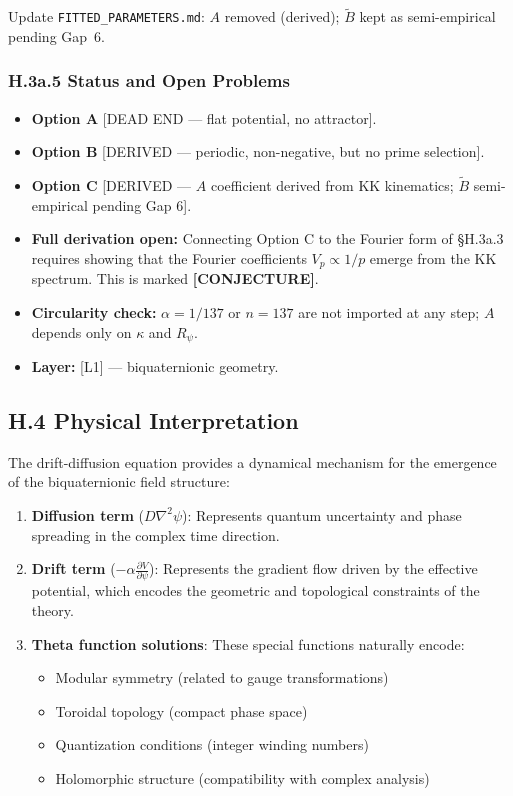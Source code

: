 Update \texttt{FITTED\_PARAMETERS.md}: $A$ removed (derived); $\tilde{B}$ kept as semi-empirical pending Gap~6.

\subsubsection*{H.3a.5 Status and Open Problems}

\begin{itemize}
\item \textbf{Option A} [DEAD END — flat potential, no attractor].
\item \textbf{Option B} [DERIVED — periodic, non-negative, but no prime selection].
\item \textbf{Option C} [DERIVED — $A$ coefficient derived from KK kinematics;
  $\tilde{B}$ semi-empirical pending Gap 6].
\item \textbf{Full derivation open:} Connecting Option C to the Fourier form of
  \S H.3a.3 requires showing that the Fourier coefficients $V_p \propto 1/p$
  emerge from the KK spectrum. This is marked \textbf{[CONJECTURE]}.
\item \textbf{Circularity check:} $\alpha=1/137$ or $n=137$ are not imported at
  any step; $A$ depends only on $\kappa$ and $R_\psi$.
\item \textbf{Layer:} [L1] — biquaternionic geometry.
\end{itemize}

\subsection*{H.4 Physical Interpretation}

The drift-diffusion equation provides a dynamical mechanism for the emergence of the biquaternionic field structure:

\begin{enumerate}
\item \textbf{Diffusion term} ($D \nabla^2 \psi$): Represents quantum uncertainty and phase spreading in the complex time direction.

\item \textbf{Drift term} ($-\alpha \frac{\partial V}{\partial \psi}$): Represents the gradient flow driven by the effective potential, which encodes the geometric and topological constraints of the theory.

\item \textbf{Theta function solutions}: These special functions naturally encode:
\begin{itemize}
\item Modular symmetry (related to gauge transformations)
\item Toroidal topology (compact phase space)
\item Quantization conditions (integer winding numbers)
\item Holomorphic structure (compatibility with complex analysis)
\end{itemize}
\end{enumerate}

